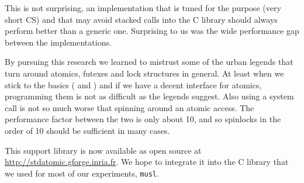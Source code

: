 This is not surprising, an implementation that is tuned
for the purpose (very short CS) and that may avoid stacked calls into
the C library should always perform better than a generic one.
Surprising to us was the wide performance gap between the
implementations.

By pursuing this research we learned to mistrust some of the
urban legends that turn around atomics, futexes and lock structures in
general. At least when we stick to the basics ( and
) and if we have a decent interface for atomics,
programming them is not as difficult as the legends suggest. Also
using a system call is not so much worse that spinning around an
atomic access. The performance factor between the two is only about
10, and so spinlocks in the order of 10 should be sufficient in many
cases.

This support library is now available as open source at
\url{http://stdatomic.gforge.inria.fr}. We hope to integrate it into the C library
that we used for most of our experiments, \texttt{musl}.


